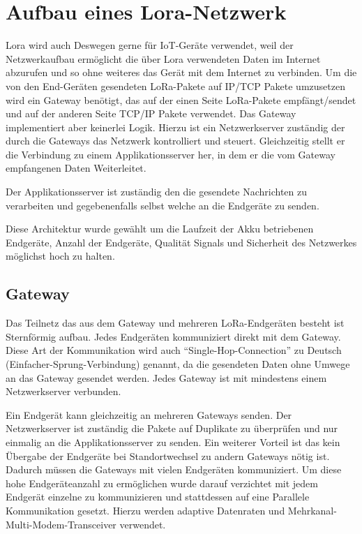 \documentclass[a4paper,12pt]{article}
\begin{document}
    \section{Aufbau eines Lora-Netzwerk}
        Lora wird auch Deswegen gerne für IoT-Geräte verwendet, weil der Netzwerkaufbau ermöglicht die über Lora 
        verwendeten Daten im Internet abzurufen und so ohne weiteres das Gerät mit dem Internet zu verbinden. Um 
        die von den End-Geräten gesendeten LoRa-Pakete auf IP/TCP Pakete umzusetzen wird ein Gateway benötigt, 
        das auf der einen Seite LoRa-Pakete empfängt/sendet und auf der anderen Seite TCP/IP Pakete verwendet.
        Das Gateway implementiert aber keinerlei Logik. Hierzu ist ein Netzwerkserver zuständig der durch die 
        Gateways das Netzwerk kontrolliert und steuert. Gleichzeitig stellt er die Verbindung zu einem 
        Applikationsserver her, in dem er die vom Gateway empfangenen Daten Weiterleitet.

        Der Applikationsserver ist zuständig den die gesendete Nachrichten zu verarbeiten und gegebenenfalls selbst 
        welche an die Endgeräte zu senden.

        Diese Architektur wurde gewählt um die Laufzeit der Akku betriebenen Endgeräte, Anzahl der Endgeräte, Qualität 
        Signals und Sicherheit des Netzwerkes möglichst hoch zu halten. \cite[S. 8 ff.]{WhatIsLoRa}
        
        \subsection{Gateway}
            Das Teilnetz das aus dem Gateway und mehreren LoRa-Endgeräten besteht ist Sternförmig aufbau. Jedes 
            Endgeräten kommuniziert direkt mit dem Gateway. Diese Art der Kommunikation wird auch 
            ``Single-Hop-Connection'' zu Deutsch (Einfacher-Sprung-Verbindung) genannt, da die gesendeten Daten ohne 
            Umwege an das Gateway gesendet werden. Jedes Gateway ist mit mindestens einem Netzwerkserver verbunden.
        
            Ein Endgerät kann gleichzeitig an mehreren Gateways senden. Der Netzwerkserver ist zuständig die Pakete 
            auf Duplikate zu überprüfen und nur einmalig an die Applikationsserver zu senden. Ein weiterer Vorteil ist 
            das kein Übergabe der Endgeräte bei Standortwechsel zu andern Gateways nötig ist. Dadurch müssen die 
            Gateways mit vielen Endgeräten kommuniziert. Um diese hohe Endgeräteanzahl zu ermöglichen wurde darauf 
            verzichtet mit jedem Endgerät einzelne zu kommunizieren und stattdessen auf eine Parallele Kommunikation 
            gesetzt. Hierzu werden adaptive Datenraten und Mehrkanal-Multi-Modem-Transceiver verwendet.
        
\end{document}
